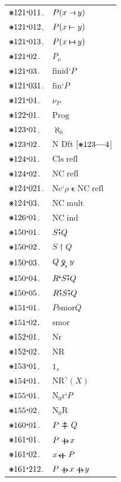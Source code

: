\documentclass[12pt,openany,leqno,twocolumn]{book}
\newcommand{\pmast}{\text{\resizebox{!}{.75\height}{\ding{107}}}} %
\newcommand{\pmcdot}{\text{\raisebox{.05cm}{$\boldsymbol\cdot$}}} %
\newcommand{\pmd}{\hbox{\rule{.3ex}{.3ex}}} %
\newcommand{\pmdot}{\mathinner{\pmd}}
\newcommand{\pmcin}{\mathop{\boldsymbol{\epsilon}}} %
\newcommand{\pmdscf}[2]{#1\textbf{`}#2} %
\newcommand{\Female}{{\usefont{U}{mvs}{m}{n}\symbol{126}}} %
\newcommand{\pmnc}[1]{\text{Nc}\textbf{`}#1} %
\newcommand{\pmintoc}[2]{P({#1}\mathbin{\scalebox{1.2}[.7]{$\boldsymbol{\dashv}$}}{#2})} %
\newcommand{\pmintco}[2]{P({#1}\mathbin{\scalebox{1.2}[.7]{$\boldsymbol{\vdash}$}}{#2})} %
\newcommand{\pmintcc}[2]{P({#1} \mathbin{\ooalign{$\scalebox{1.2}[.7]{$\boldsymbol{\dashv}$}$\hidewidth\cr$\scalebox{1.2}[.7]{$\boldsymbol{\vdash}$}$}} {#2})} %
\newcommand{\pmintnc}[1]{P_{#1}} %
\newcommand{\pmfinid}[1]{\text{finid}\textbf{`}#1} %
\newcommand{\pmfin}[1]{\text{fin}\textbf{`}#1} %
\newcommand{\pmintt}[2]{#1_{#2}} %
\newcommand{\pmprog}{\text{Prog}} %
\newcommand{\pmaleph}{\boldsymbol{\aleph}} %
\newcommand{\pmsucc}{\text{N}} %
\newcommand{\pmclsrefl}{\text{Cls}\;\text{refl}} %
\newcommand{\pmncrefl}{\text{NC}\;\text{refl}} %
\newcommand{\pmncmult}{\text{NC}\;\text{mult}} %
\newcommand{\pmncind}{\text{NC}\;\text{ind}} %
\newcommand{\pmrnsm}[2]{{#1}{\raise.4ex\hbox{\textbf{\large;}}}{#2}} %
\newcommand{\pmrnsmd}[2]{#1 \mathop{\boldsymbol{\dagger}} #2} %
\newcommand{\pmopsc}[2]{#1 \mathrel{\ooalign{${\raise-.7ex\hbox{$\pmdot$}}$\hidewidth\cr$\text{\Female}$\hidewidth\cr${\raise-.8ex\hbox{\hspace{.15cm}\textbf{,}}}$}} #2} %
\newcommand{\pmsmorb}[2]{#1 \mathrel{\overline{\text{smor}}} #2} %
\newcommand{\pmSmor}{\text{smor}}
\newcommand{\pmNr}{\text{Nr}}
\newcommand{\pmNR}{\text{NR}} %
\newcommand{\pmsrrn}[1]{{#1}_{s}} %
\newcommand{\pmNRat}[2]{\text{NR}^{#1}({#2})} %
\newcommand{\pmnor}[1]{\text{N}_0\text{r}\textbf{`}#1} %
\newcommand{\pmNoR}{\text{N}_0\text{R}} %
\newcommand{\pmrsum}[2]{#1\mathrel{\ooalign{${\raise-.21ex\hbox{$\boldsymbol{-}$}}$\cr\hidewidth$\boldsymbol{\uparrow}$\hidewidth\cr${\raise-.19ex\hbox{$\boldsymbol{-}$}}$}} #2} %
\newcommand{\pmRsum}{\mathrel{\ooalign{${\raise-.21ex\hbox{$\boldsymbol{-}$}}$\cr\hidewidth$\boldsymbol{\uparrow}$\hidewidth\cr${\raise-.19ex\hbox{$\boldsymbol{-}$}}$}}}
\newcommand{\pmrsume}[2]{#1 \mathrel{\rotatebox[origin=c]{90}{$\pmRsum$}} #2} %
\newcommand{\pmrsumb}[2]{#1 \mathrel{\rotatebox[origin=c]{270}{$\pmRsum$}} #2} %
\newcommand{\pmalephn}[1]{\pmaleph_{#1}} %
\begin{document}
\begin{tabular}{l l}
	$\pmast121\pmcdot011$. & $\pmintoc{x}{y}$ \\
	$\pmast121\pmcdot012$. & $\pmintco{x}{y}$ \\
	$\pmast121\pmcdot013$. & $\pmintcc{x}{y}$ \\
	$\pmast121\pmcdot02$. & $\pmintnc{\nu}$ \\
	$\pmast121\pmcdot03$. & $\pmfinid{P}$ \\
	$\pmast121\pmcdot031$. & $\pmfin{P}$ \\
	$\pmast121\pmcdot04$. & $\pmintt{\nu}{P}$ \\
	$\pmast122\pmcdot01$. & $\pmprog$ \\
	$\pmast123\pmcdot01$. & $\pmalephn{0}$ \\
	$\pmast123\pmcdot02$. & $\pmsucc$ Dft [$\pmast123\textbf{---}4$] \\
	$\pmast124\pmcdot01$. & $\pmclsrefl$ \\
	$\pmast124\pmcdot02$. & $\pmncrefl$ \\
	$\pmast124\pmcdot021$. & $\pmnc{\rho}\pmcin \pmncrefl$ \\
	$\pmast124\pmcdot03$. & $\pmncmult$ \\
	$\pmast126\pmcdot01$. & $\pmncind$ \\
	$\pmast150\pmcdot01$. & $\pmrnsm{S}{Q}$ \\
	$\pmast150\pmcdot02$. & $\pmrnsmd{S}{Q}$ \\
	$\pmast150\pmcdot03$. & $\pmopsc{Q}{y}$ \\
	$\pmast150\pmcdot04$. & $\pmdscf{R}{\pmrnsm{S}{Q}}$ \\
	$\pmast150\pmcdot05$. & $\pmrnsm{R}{\pmrnsm{S}{Q}}$ \\
	$\pmast151\pmcdot01$. & $\pmsmorb{P}{Q}$ \\
	$\pmast151\pmcdot02$. & $\pmSmor$ \\
	$\pmast152\pmcdot01$. & $\pmNr$ \\
	$\pmast152\pmcdot02$. & $\pmNR$ \\
	$\pmast153\pmcdot01$. & $\pmsrrn{1}$ \\
	$\pmast154\pmcdot01$. & $\pmNRat{\gamma}{X}$ \\
	$\pmast155\pmcdot01$. & $\pmnor{P}$ \\
	$\pmast155\pmcdot02$. & $\pmNoR$ \\
	$\pmast160\pmcdot01$. & $\pmrsum{P}{Q}$ \\
	$\pmast161\pmcdot01$. & $\pmrsumb{P}{x}$ \\
	$\pmast161\pmcdot02$. & $\pmrsume{x}{P}$ \\
	$\pmast161\pmcdot212$. & $\pmrsumb{P}{\pmrsumb{x}{y}}$ 
\end{tabular}
\end{document}
